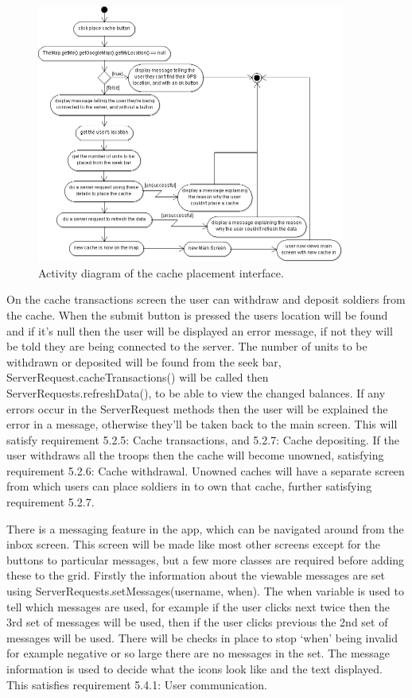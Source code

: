 \newpage
\begin{figure}
    \centering
    \includegraphics[width=0.9\textwidth]{images/activity/placeCache}
    \caption{Activity diagram of the cache placement interface.}
\end{figure}

On the cache transactions screen the user can withdraw and deposit soldiers from the cache. When the submit button is pressed the users location will be found and if it's null then the user will be displayed an error message, if not they will be told they are being connected to the server. The number of units to be withdrawn or deposited will be found from the seek bar, ServerRequest.cacheTransactions() will be called then ServerRequests.refreshData(), to be able to view the changed balances. If any errors occur in the ServerRequest methods then the user will be explained the error in a message, otherwise they'll be taken back to the main screen. This will satisfy requirement 5.2.5: Cache transactions, and 5.2.7: Cache depositing. If the user withdraws all the troops then the cache will become unowned, satisfying requirement 5.2.6: Cache withdrawal. Unowned caches will have a separate screen from which users can place soldiers in to own that cache, further satisfying requirement 5.2.7.

There is a messaging feature in the app, which can be navigated around from the inbox screen. This screen will be made like most other screens except for the buttons to particular messages, but a few more classes are required before adding these to the grid. Firstly the information about the viewable messages are set using ServerRequests.setMessages(username, when). The when variable is used to tell which messages are used, for example if the user clicks next twice then the 3rd set of messages will be used, then if the user clicks previous the 2nd set of messages will be used. There will be checks in place to stop `when' being invalid for example negative or so large there are no messages in the set. The message information is used to decide what the icons look like and the text displayed. This satisfies requirement 5.4.1: User communication.

